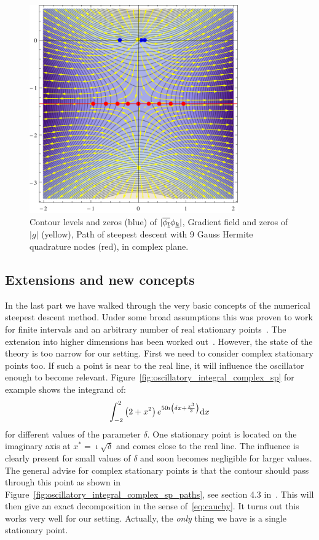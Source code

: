 \documentclass[a4paper,10pt]{article}
\begin{document}
\begin{figure}[h!]
  \centering
  \includegraphics[width=0.8\textwidth]{./fig/stationary_point_example.pdf}
  \caption{Contour levels and zeros (blue) of $|\overline{\phi_{\underline{l}}} \phi_{\underline{k}}|$,
  Gradient field and zeros of $|g|$ (yellow), Path of steepest descent with 9 Gauss Hermite
  quadrature nodes (red), in complex plane.}
  \label{fig:hawp_trafo_example}
\end{figure}


\subsection{Extensions and new concepts}


In the last part we have walked through the very basic concepts of the numerical steepest
descent method. Under some broad assumptions this was proven to work for finite intervals
and an arbitrary number of real stationary points~\cite{HV_hoq}. The extension into higher
dimensions has been worked out~\cite{HV_cub}.
However, the state of the theory is too narrow for our setting. First we need to consider
complex stationary points too. If such a point is near to the real line, it will influence
the oscillator enough to become relevant. Figure~\ref{fig:oscillatory_integral_complex_sp}
for example shows the integrand of:
\begin{equation}\label{eq:nsd_csp_integral_example}
  \int_{-2}^{2} \left(2+x^2\right) e^{50 \imath \left(\delta x + \frac{x^3}{3}\right)} \mathrm{d}x
\end{equation}
for different values of the parameter $\delta$. One stationary point is located on the imaginary axis
at $x^{*} = \imath \sqrt{\delta}$ and comes close to the real line. The influence is clearly present
for small values of $\delta$ and soon becomes negligible for larger values.
The general advise for complex stationary points is that the contour should pass through
this point as shown in Figure~\ref{fig:oscillatory_integral_complex_sp_paths},
see section 4.3 in~\cite{HV_hoq}. This will then give an exact
decomposition in the sense of~\eqref{eq:cauchy}. It turns out this works very well for our setting.
Actually, the \emph{only} thing we have is a single stationary point.
\end{document}
